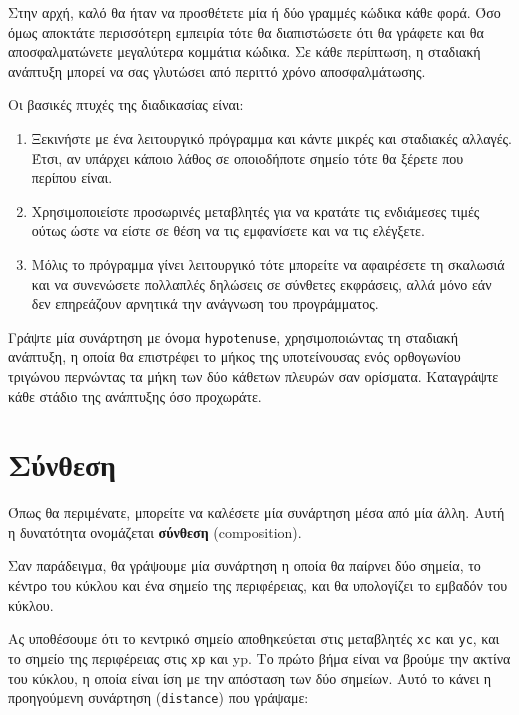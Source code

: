 \documentclass[10pt]{book}
\begin{document}
Στην αρχή, καλό θα ήταν να προσθέτετε μία ή δύο γραμμές κώδικα κάθε φορά.
Όσο όμως αποκτάτε περισσότερη εμπειρία τότε θα διαπιστώσετε ότι θα γράφετε και
θα αποσφαλματώνετε μεγαλύτερα κομμάτια κώδικα. Σε κάθε περίπτωση, η σταδιακή ανάπτυξη μπορεί να σας γλυτώσει από περιττό χρόνο αποσφαλμάτωσης.

Οι βασικές πτυχές της διαδικασίας είναι:

\begin{enumerate}

\item  Ξεκινήστε με ένα λειτουργικό πρόγραμμα και κάντε μικρές και
σταδιακές αλλαγές. Έτσι, αν υπάρχει κάποιο λάθος σε οποιοδήποτε σημείο τότε θα
ξέρετε που περίπου είναι.

\item  Χρησιμοποιείστε προσωρινές μεταβλητές για να κρατάτε τις ενδιάμεσες
τιμές ούτως ώστε να είστε σε θέση να τις εμφανίσετε και να τις ελέγξετε.

\item  Μόλις το πρόγραμμα γίνει λειτουργικό τότε μπορείτε να αφαιρέσετε τη
σκαλωσιά και να συνενώσετε πολλαπλές δηλώσεις σε σύνθετες εκφράσεις, αλλά μόνο εάν δεν επηρεάζουν αρνητικά την ανάγνωση του προγράμματος.
\\
\end{enumerate}


\begin{exercise}

Γράψτε μία συνάρτηση με όνομα {\tt hypotenuse}, χρησιμοποιώντας τη σταδιακή ανάπτυξη, η οποία θα επιστρέφει το μήκος της υποτείνουσας ενός
ορθογωνίου τριγώνου περνώντας τα μήκη των δύο κάθετων πλευρών σαν ορίσματα.
Καταγράψτε κάθε στάδιο της ανάπτυξης όσο προχωράτε.
\end{exercise}

\section{Σύνθεση}

Όπως θα περιμένατε, μπορείτε να καλέσετε μία συνάρτηση μέσα από
μία άλλη. Αυτή η δυνατότητα ονομάζεται {\bf σύνθεση} (composition). 

Σαν παράδειγμα, θα γράψουμε μία συνάρτηση η οποία θα παίρνει δύο σημεία,
το κέντρο του κύκλου και ένα σημείο της περιφέρειας, και θα υπολογίζει
το εμβαδόν του κύκλου.

Ας υποθέσουμε ότι το κεντρικό σημείο αποθηκεύεται στις μεταβλητές {\tt xc}
και {\tt yc}, και το σημείο της περιφέρειας στις {\tt xp} και {yp}. 
Το πρώτο βήμα είναι να βρούμε την ακτίνα του κύκλου, η οποία είναι ίση με την απόσταση των δύο σημείων. Αυτό το κάνει η προηγούμενη συνάρτηση ({\tt distance}) που γράψαμε:
\end{document}
